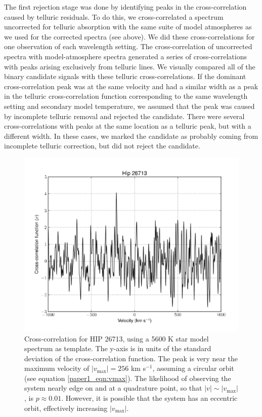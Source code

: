 The first rejection stage was done by identifying peaks in the
cross-correlation caused by telluric residuals. To do this, we
cross-correlated a spectrum uncorrected for telluric absorption with
the same suite of model atmospheres as we used for the corrected
spectra (see above). We did these cross-correlations for one observation of each wavelength
setting. The cross-correlation of uncorrected spectra with model-atmosphere spectra generated a series of cross-correlations with peaks
arising exclusively from telluric lines. We visually compared all
of the binary candidate signals with these telluric
cross-correlations. If the dominant cross-correlation peak was at the
same velocity and had a similar width as a peak in the telluric
cross-correlation function corresponding to the same wavelength
setting and secondary model temperature, we assumed that the peak was caused by incomplete
telluric removal and rejected the candidate. There were several
cross-correlations with peaks at the same location as a telluric peak,
but with a different width. In these cases, we marked the candidate as
probably coming from incomplete telluric correction, but did not
reject the candidate.



\begin{figure}[ht]
  \centering
  \includegraphics[width=\columnwidth]{Figures/paper1_fig4.pdf}
  \caption{Cross-correlation for HIP 26713, using a 5600 K star model spectrum as template. The y-axis is in units of
    the standard deviation of the cross-correlation function. The peak is very near the maximum velocity of $|v_\mathrm{max}| = 256$ km s$^{-1}$, assuming a circular orbit (see equation \ref{paper1_eqn:vmax}). The likelihood of observing the system nearly edge on and at a quadrature point, so that $|v| \sim |v_\mathrm{max}|$, is $p \approx 0.01$. However, it is possible that the system has an eccentric orbit, effectively increasing $|v_\mathrm{max}|$.}
  \label{paper1_fig:hip26713}
\end{figure}

